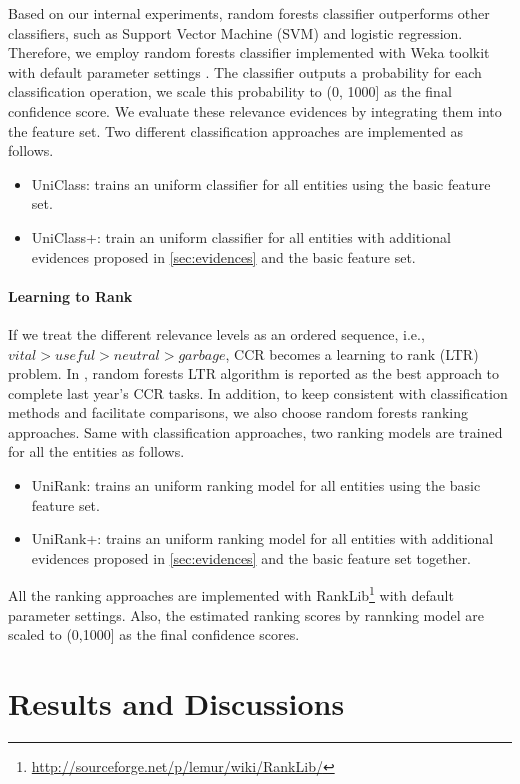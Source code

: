 \documentclass{sig-alternate}
\begin{document}
Based on our internal experiments, random forests classifier outperforms other classifiers, such as Support Vector Machine (SVM) and  logistic regression. Therefore, we employ random forests classifier implemented with Weka toolkit with default parameter settings \cite{Hall:2009:WDM:1656274.1656278}. The classifier outputs a probability for each classification operation, we scale this probability to (0, 1000] as the final confidence score. We evaluate these relevance evidences by integrating them into the feature set. Two different  classification approaches are implemented as follows.
\begin{itemize}
\item{UniClass:} trains an uniform classifier for all entities using the basic feature set.
\item{UniClass+:} train an uniform classifier for all entities with additional evidences proposed in \autoref{sec:evidences} and the basic feature set.
\end{itemize}

\paragraph{Learning to Rank}
If we treat the different relevance levels as an ordered sequence, i.e., $vital > useful > neutral > garbage$, CCR becomes a learning to rank (LTR) problem. In \cite{Balog:2013:CCR:2484028.2484151}, random forests LTR algorithm is reported as the best approach to complete last year's CCR tasks. In addition, to keep consistent with classification methods and facilitate  comparisons, we also choose random forests ranking approaches. Same with classification approaches, two ranking models are trained for all the entities as follows.
\begin{itemize}
\item{UniRank:} trains an uniform ranking model for all entities using the basic feature set.
\item{UniRank+:} trains an uniform ranking model for all entities with additional evidences proposed in \autoref{sec:evidences} and the basic feature set together.
\end{itemize}
All the ranking approaches are implemented with RankLib\footnote{\url{http://sourceforge.net/p/lemur/wiki/RankLib/}} with default parameter settings.  Also, the estimated ranking scores by rannking model are scaled to (0,1000] as the final confidence scores.

\section{Results and Discussions}\label{sec:results}
\end{document}
